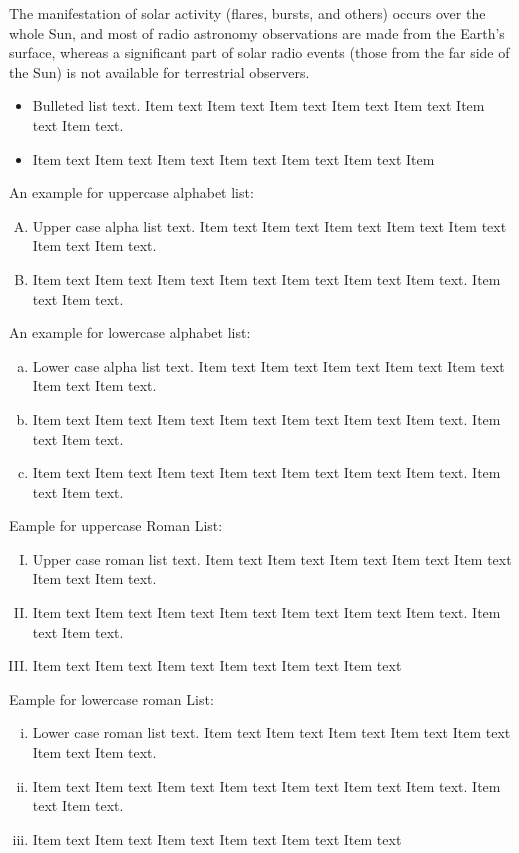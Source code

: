 The manifestation of solar activity (flares, bursts, and others) occurs over the whole Sun, and most of radio astronomy observations are made from the Earth's surface, whereas a significant part of solar radio events (those from the far side of the Sun) is not available for terrestrial observers.
\begin{itemize}
\item Bulleted list text. Item text  Item text  Item text  Item text  Item text
Item text  Item text.
\item Item text  Item text  Item text  Item text  Item text  Item text  Item 
\end{itemize}

An example for uppercase alphabet list:
\begin{enumerate}[A.]
\item Upper case alpha list text. Item text  Item text  Item text  Item text  
Item text Item text  Item text.
\item Item text  Item text  Item text  Item text  Item text  Item text  Item
 text. Item text  Item text.
\end{enumerate}

An example for lowercase alphabet list:
\begin{enumerate}[a.]
\item Lower case alpha list text. Item text  Item text  Item text  Item text  Item text
Item text  Item text.
\item Item text  Item text  Item text  Item text  Item text  Item text  Item text. Item text  Item text.
\item Item text  Item text  Item text  Item text  Item text  Item text  Item 
text. Item text  Item text.
\end{enumerate}

\clearpage

Eample for uppercase Roman List:
\begin{enumerate}[I.]
\item Upper case roman list text. Item text  Item text  Item text  Item 
text  Item text Item text  Item text.
\item Item text  Item text  Item text  Item text  Item text  Item text 
Item text. Item text  Item text.
\item Item text  Item text  Item text  Item text  Item text  Item text 
\end{enumerate}

Eample for lowercase roman List:
\begin{enumerate}[i.]
\item Lower case roman list text. Item text  Item text  Item text  Item 
text  Item text Item text  Item text.
\item Item text  Item text  Item text  Item text  Item text  Item text 
Item text. Item text  Item text.
\item Item text  Item text  Item text  Item text  Item text  Item text 
\end{enumerate}


